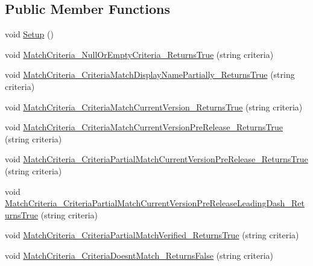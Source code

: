 \subsection*{Public Member Functions}
\begin{DoxyCompactItemize}
\item 
void \mbox{\hyperlink{class_unity_editor_1_1_package_manager_1_1_u_i_1_1_tests_1_1_package_search_tests_ae0af173d00abe16f5507a58042c4f4c7}{Setup}} ()
\item 
void \mbox{\hyperlink{class_unity_editor_1_1_package_manager_1_1_u_i_1_1_tests_1_1_package_search_tests_a09426b3f6170cb8d9a1afbdcfb38842c}{Match\+Criteria\+\_\+\+Null\+Or\+Empty\+Criteria\+\_\+\+Returns\+True}} (string criteria)
\item 
void \mbox{\hyperlink{class_unity_editor_1_1_package_manager_1_1_u_i_1_1_tests_1_1_package_search_tests_ab7d9d52f26706b43529d74fd315c10b9}{Match\+Criteria\+\_\+\+Criteria\+Match\+Display\+Name\+Partially\+\_\+\+Returns\+True}} (string criteria)
\item 
void \mbox{\hyperlink{class_unity_editor_1_1_package_manager_1_1_u_i_1_1_tests_1_1_package_search_tests_a2ba0175162fd71f13e527c8ffd3d4d8e}{Match\+Criteria\+\_\+\+Criteria\+Match\+Current\+Version\+\_\+\+Returns\+True}} (string criteria)
\item 
void \mbox{\hyperlink{class_unity_editor_1_1_package_manager_1_1_u_i_1_1_tests_1_1_package_search_tests_af4d61f55af7634bf9b20bf598272c73e}{Match\+Criteria\+\_\+\+Criteria\+Match\+Current\+Version\+Pre\+Release\+\_\+\+Returns\+True}} (string criteria)
\item 
void \mbox{\hyperlink{class_unity_editor_1_1_package_manager_1_1_u_i_1_1_tests_1_1_package_search_tests_ad7764ccdca43f1c514b61de7e4bf494a}{Match\+Criteria\+\_\+\+Criteria\+Partial\+Match\+Current\+Version\+Pre\+Release\+\_\+\+Returns\+True}} (string criteria)
\item 
void \mbox{\hyperlink{class_unity_editor_1_1_package_manager_1_1_u_i_1_1_tests_1_1_package_search_tests_a8a65a57c2927b54bbf286f9096233450}{Match\+Criteria\+\_\+\+Criteria\+Partial\+Match\+Current\+Version\+Pre\+Release\+Leading\+Dash\+\_\+\+Returns\+True}} (string criteria)
\item 
void \mbox{\hyperlink{class_unity_editor_1_1_package_manager_1_1_u_i_1_1_tests_1_1_package_search_tests_a1abc0ff8b9f82ebc843c92a0c3e88e92}{Match\+Criteria\+\_\+\+Criteria\+Partial\+Match\+Verified\+\_\+\+Returns\+True}} (string criteria)
\item 
void \mbox{\hyperlink{class_unity_editor_1_1_package_manager_1_1_u_i_1_1_tests_1_1_package_search_tests_ad24487967c023724fa4fc16c5ec346a6}{Match\+Criteria\+\_\+\+Criteria\+Doesnt\+Match\+\_\+\+Returns\+False}} (string criteria)
\end{DoxyCompactItemize}
